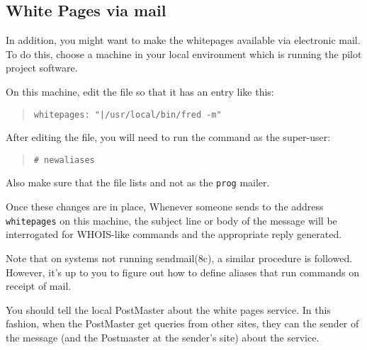 \subsection	{White Pages via mail}\label{wp:mail}
In addition,
you might want to make the whitepages available via electronic mail.
To do this,
choose a machine in your local environment which is running the pilot project
software.

On this machine,
edit the file  so that it has an entry like this:
\begin{quote}\small\begin{verbatim}
whitepages: "|/usr/local/bin/fred -m"
\end{verbatim}\end{quote}
After editing the  file,
you will need to run the  command as the super-user:
\begin{quote}\small\begin{verbatim}
# newaliases
\end{verbatim}\end{quote}
Also make sure that the  file lists  and not
 as the \verb"prog" mailer.

Once these changes are in place,
Whenever someone sends to the address \verb"whitepages" on this machine,
the subject line or body of the message will be interrogated for WHOIS-like
commands and the appropriate reply generated.

Note that on systems not running \man sendmail(8c),
a similar procedure is followed.
However,
it's up to you to figure out how to define aliases that run commands on
receipt of mail.

You should tell the local PostMaster about the white pages service.
In this fashion,
when the PostMaster get queries from other sites,
they can the sender of the message
(and the Postmaster at the sender's site)
about the service.


